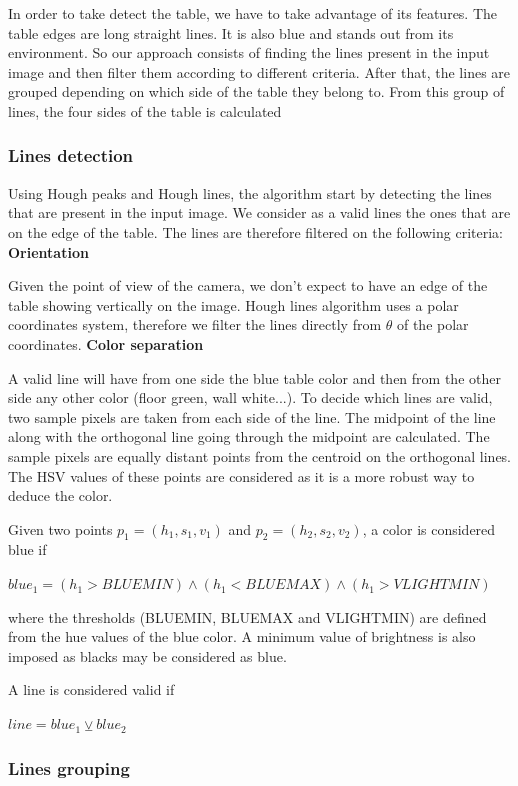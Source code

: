 \documentclass[a4paper]{article}
\begin{document}
In order to take detect the table, we have to take advantage of its features. The table edges are long straight lines. It is also blue and stands out from its environment. So our approach consists of finding the lines present in the input image and then filter them according to different criteria. After that, the lines are grouped depending on which side of the table they belong to. From this group of lines, the four sides of the table is calculated

\subsubsection{Lines detection}

Using Hough peaks and Hough lines, the algorithm start by detecting the lines that are present in the input image. We consider as a valid lines the ones that are on the edge of the table. The lines are therefore filtered on the following criteria:
\bigbreak
\textbf{Orientation}

Given the point of view of the camera, we don't expect to have an edge of the table showing vertically on the image. Hough lines algorithm uses a polar coordinates system, therefore we filter the lines directly from $\theta$ of the polar coordinates.
\bigbreak
\textbf{Color separation}

A valid line will have from one side the blue table color and then from the other side any other color (floor green, wall white...). To decide which lines are valid, two sample pixels are taken from each side of the line. The midpoint of the line along with the orthogonal line going through the midpoint are calculated. The sample pixels are equally distant points from the centroid on the orthogonal lines. The HSV values of these points are considered as it is a more robust way to deduce the color.

Given two points $p_{1} = (h_{1}, s_{1}, v_{1})$ and $p_{2} = (h_{2}, s_{2}, v_{2})$, a color is considered blue if

$blue_{1} = (h_{1} > BLUEMIN) \wedge (h_{1} < BLUEMAX) \wedge (h_{1} > VLIGHTMIN)$

where the thresholds (BLUEMIN, BLUEMAX and VLIGHTMIN) are defined from the hue values of the blue color. A minimum value of brightness is also imposed as blacks may be considered as blue.

A line is considered valid if

$line = blue_{1} \veebar blue_{2}$  

\subsubsection{Lines grouping}
\end{document}
